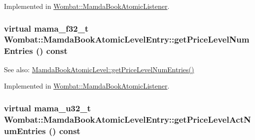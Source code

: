 Implemented in \hyperlink{classWombat_1_1MamdaBookAtomicListener_85bb50891ec86cc8e1850b4097498a89}{Wombat::Mamda\-Book\-Atomic\-Listener}.\hypertarget{classWombat_1_1MamdaBookAtomicLevelEntry_2b0e245946eb50433a6d88f6f60da675}{
\subsubsection[getPriceLevelNumEntries]{\setlength{\rightskip}{0pt plus 5cm}virtual mama\_\-f32\_\-t Wombat::Mamda\-Book\-Atomic\-Level\-Entry::get\-Price\-Level\-Num\-Entries () const}}
\label{classWombat_1_1MamdaBookAtomicLevelEntry_2b0e245946eb50433a6d88f6f60da675}


\begin{Desc}
\item[See also:]\hyperlink{classWombat_1_1MamdaBookAtomicLevel_8a11dfebeccc889960a783b7e4377735}{Mamda\-Book\-Atomic\-Level::get\-Price\-Level\-Num\-Entries()} \end{Desc}


Implemented in \hyperlink{classWombat_1_1MamdaBookAtomicListener_85367024e7790ce720c241849bf38ec2}{Wombat::Mamda\-Book\-Atomic\-Listener}.\hypertarget{classWombat_1_1MamdaBookAtomicLevelEntry_9c206e1b9ce877f5a5386dc79721aed6}{
\subsubsection[getPriceLevelActNumEntries]{\setlength{\rightskip}{0pt plus 5cm}virtual mama\_\-u32\_\-t Wombat::Mamda\-Book\-Atomic\-Level\-Entry::get\-Price\-Level\-Act\-Num\-Entries () const}}
\label{classWombat_1_1MamdaBookAtomicLevelEntry_9c206e1b9ce877f5a5386dc79721aed6}




